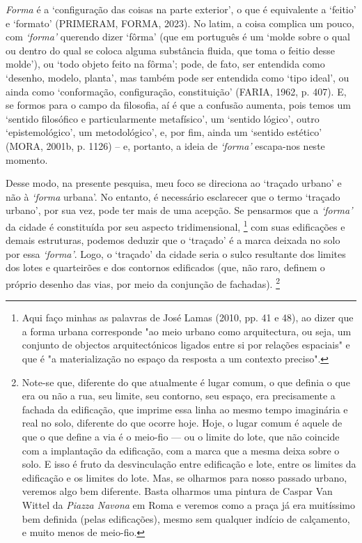 \documentclass[12pt, a4paper]{book} %
\begin{document}
            \textit{Forma} é a `configuração das coisas na parte exterior', o que é equivalente a `feitio' e `formato' (PRIMERAM, FORMA, 2023). No latim, a coisa complica um pouco, com \textit{`forma'} querendo dizer `fôrma' (que em português é um `molde sobre o qual ou dentro do qual se coloca alguma substância fluida, que toma o feitio desse molde'), ou `todo objeto feito na fôrma'; pode, de fato, ser entendida como `desenho, modelo, planta', mas também pode ser entendida como `tipo ideal', ou ainda como `conformação, configuração, constituição' (FARIA, 1962, p. 407). E, se formos para o campo da filosofia, aí é que a confusão aumenta, pois temos um `sentido filosófico e particularmente metafísico', um `sentido lógico', outro `epistemológico', um metodológico', e, por fim, ainda um `sentido estético' (MORA, 2001b, p. 1126) – e, portanto, a ideia de \textit{`forma'} escapa-nos neste momento.

            Desse modo, na presente pesquisa, meu foco se direciona ao `traçado urbano' e não à \textit{`forma} urbana'. No entanto, é necessário esclarecer que o termo `traçado urbano', por sua vez, pode ter mais de uma acepção. Se pensarmos que a \textit{`forma'} da cidade é constituída por seu aspecto tridimensional,
                \footnote[6]{Aqui faço minhas as palavras de José Lamas (2010, pp. 41 e 48), ao dizer que a forma urbana corresponde "ao meio urbano como arquitectura, ou seja, um conjunto de objectos arquitectónicos ligados entre si por relações espaciais" e que é "a materialização no espaço da resposta a um contexto preciso".} 
            com suas edificações e demais estruturas, podemos deduzir que o `traçado' é a marca deixada no solo por essa \textit{`forma'}. Logo, o `traçado' da cidade seria o sulco resultante dos limites dos lotes e quarteirões e dos contornos edificados (que, não raro, definem o próprio desenho das vias, por meio da conjunção de fachadas).
                \footnote[7]{Note-se que, diferente do que atualmente é lugar comum, o que definia o que era ou não a rua, seu limite, seu contorno, seu espaço, era precisamente a fachada da edificação, que imprime essa linha ao mesmo tempo imaginária e real no solo, diferente do que ocorre hoje. Hoje, o lugar comum é aquele de que o que define a via é o meio-fio — ou o limite do lote, que não coincide com a implantação da edificação, com a marca que a mesma deixa sobre o solo. E isso é fruto da desvinculação entre edificação e lote, entre os limites da edificação e os limites do lote. Mas, se olharmos para nosso passado urbano, veremos algo bem diferente. Basta olharmos uma pintura de Caspar Van Wittel da \textit{Piazza Navona} em Roma e veremos como a praça já era muitíssimo bem definida (pelas edificações), mesmo sem qualquer indício de calçamento, e muito menos de meio-fio.} 
\end{document}
